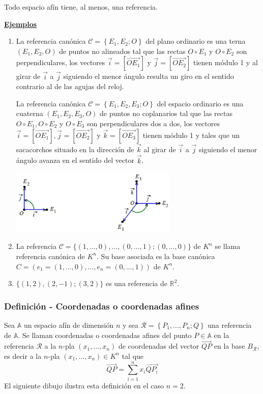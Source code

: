 \documentclass[12pt, a4paper, ones, notitlepage, openany,titlepage]{article}
\newcommand{\ejemplos}{\noindent\underline{\textbf{Ejemplos}}}
\begin{document}
\noindent Todo espacio afín tiene, al menos, una referencia.

\ejemplos
\begin{enumerate}[label=(\arabic*)]
\item La referencia canónica $\mathcal{C}=\left\{E_{1}, E_{2} ; O\right\}$ del plano ordinario es una terna $\left(E_{1}, E_{2}, O\right)$ de puntos no alineados tal que las rectas $O \circ E_{1}$ y $O \circ E_{2}$ son perpendiculares, los vectores $\vec{i}=\left[\overrightarrow{O E_{1}}\right]$ y $\vec{j}=\left[\overrightarrow{O E_{2}}\right]$ tienen módulo 1 y al girar de $\vec{i}$ a $\vec{j}$ siguiendo el menor ángulo resulta un giro en el sentido contrario al de las agujas del reloj.

La referencia canónica $\mathcal{C}=\left\{E_{1}, E_{2}, E_{3} ; O\right\}$ del espacio ordinario es una cuaterna $\left(E_{1}, E_{2}, E_{3}, O\right)$ de puntos no coplanarios tal que las rectas $O \circ E_{1}, O \circ E_{2}$ y $O \circ E_{3}$ son perpendiculares dos a dos, los vectores $\vec{i}=\left[\overrightarrow{O E_{1}}\right], \vec{j}=\left[\overrightarrow{O E_{2}}\right]$ y $\vec{k}=\left[\overrightarrow{O E_{3}}\right]$ tienen módulo 1 y tales que un sacacorchos situado en la dirección de $\vec{k}$ al girar de $\vec{i}$ a $\vec{j}$ siguiendo el menor ángulo avanza en el sentido del vector $\vec{k}$.

\includegraphics[max width=8cm, center]{2023_03_01_7659aec5e35f9a9b2d3cg-12(1)}

\item La referencia $\mathcal{C}=\{(1, \ldots, 0), \ldots,(0, \ldots, 1) ;(0, \ldots, 0)\}$ de $K^{n}$ se llama referencia canónica de $K^{n}$. Su base asociada es la base canónica $C=\left(e_{1}=(1, \ldots, 0), \ldots, e_{n}=(0, \ldots, 1)\right)$ de $K^{n}$.

\item $\{(1,2),(2,-1) ;(3,2)\}$ es una referencia de $\mathbb{R}^{2}$.
\end{enumerate}

\subsubsection{Definición - Coordenadas o coordenadas afines}
Sea $\mathbb{A}$ un espacio afín de dimensión $n$ y sea $\mathcal{R}=\left\{P_{1}, \ldots, P_{n} ; Q\right\}$ una referencia de $\mathbb{A}$. Se llaman coordenadas o coordenadas afines del punto $P \in \mathbb{A}$ en la referencia $\mathcal{R}$ a la $n$-pla $\left(x_{1}, \ldots, x_{n}\right)$ de coordenadas del vector $\overrightarrow{Q P}$ en la base $B_{\mathcal{R}}$, es decir a la $n$-pla $\left(x_{1}, \ldots, x_{n}\right) \in K^{n}$ tal que
$$
\overrightarrow{Q P}=\sum_{i=1}^{n} x_{i} \overrightarrow{Q P_{i}}
$$
\noindent El siguiente dibujo ilustra esta definición en el caso $n=2$.
\end{document}
